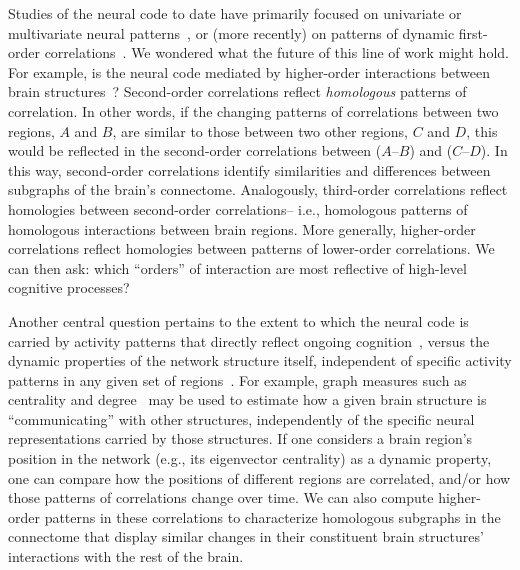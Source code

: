 \documentclass[english]{article}
\begin{document}
Studies of the neural code to date have primarily focused on
univariate or multivariate neural patterns~\citep[for review
see][]{NormEtal06}, or (more recently) on patterns of dynamic
first-order correlations~\citep[i.e., interactions between pairs of
brain structures;][]{MannEtal18, FongEtal19, LuriEtal18, PretEtal17,
  ZouEtal19, DemeEtal19}.  We wondered what the
future of this line of work might hold.  For example, is the neural
code mediated by higher-order interactions between brain
structures~\citep[e.g., see][]{ReimEtal17}?
Second-order correlations reflect \textit{homologous} patterns of
correlation.  In other words, if the changing patterns of correlations
between two regions, $A$ and $B$, are similar to those between two
other regions, $C$ and $D$, this would be reflected in the
second-order correlations between ($A$--$B$) and ($C$--$D$).  In this
way, second-order correlations identify similarities and differences
between subgraphs of the brain's connectome.  Analogously, third-order
correlations reflect homologies between second-order correlations--
i.e., homologous patterns of homologous interactions between brain
regions.  More generally, higher-order correlations reflect homologies
between patterns of lower-order correlations.  We can then ask: which
``orders'' of interaction are most reflective of high-level cognitive
processes?

Another central question pertains to the extent to which the neural
code is carried by activity patterns that directly reflect ongoing
cognition~\citep[e.g., following][]{HaxbEtal01, NormEtal06}, versus
the dynamic properties of the network structure itself, independent of
specific activity patterns in any given set of regions~\citep[e.g.,
following][]{BassEtal06}.  For example, graph measures such as
centrality and degree~\citep{BullSpor09} may be used to estimate how a
given brain structure is ``communicating'' with other structures,
independently of the specific neural representations carried by those
structures.  If one considers a brain region's position in the network
(e.g., its eigenvector centrality) as a dynamic property, one can
compare how the positions of different regions are correlated, and/or
how those patterns of correlations change over time.  We can also
compute higher-order patterns in these correlations to characterize
homologous subgraphs in the connectome that display similar changes in
their constituent brain structures' interactions with the rest of the
brain.
\end{document}
